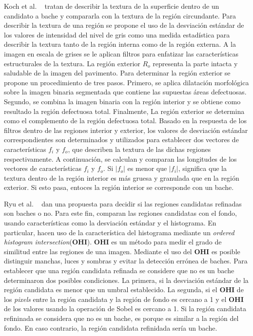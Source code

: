 		Koch et al. ~ tratan de describir la textura de la superficie dentro de un candidato a bache y compararla con la textura de la 
		región circundante. Para describir la textura de una región se propone el uso de la desviación estándar de los valores de intensidad del nivel 
		de gris como una medida estadística para describir la textura  tanto de la región interna como de la región externa. A la imagen en escala de 
		grises se le aplican filtros para enfatizar las características estructurales de la textura. La región exterior $R_o$ representa la parte intacta y 
		saludable de la imagen del pavimento. Para determinar la región exterior se propone un  procedimiento de tres pasos. Primero, 
		se aplica dilatación morfológica sobre la imagen binaria segmentada que contiene las supuestas áreas defectuosas. Segundo, 
		se combina la imagen binaria con la región interior y se obtiene como resultado la región defectuosa total. Finalmente, 
		La región exterior se determina como el complemento de la región defectuosa total. Basado en la respuesta de los filtros dentro de las regiones 
		interior y exterior, los valores de desviación estándar correspondientes son determinados y utilizados para establecer dos vectores de características 
		$f_i$ y $f_o$, que describen la textura de las dichas regiones respectivamente. A continuación, se calculan y comparan las longitudes de los vectores de 
		características $f_i$ y $f_o$. Si $|f_o|$  es menor que  $|f_i|$, significa que la textura dentro de la región interior es más gruesa y granulada que en 
		la región exterior. Si esto pasa, entoces la región interior se corresponde con un bache.


		Ryu et al. ~ dan una propuesta para decidir si las regiones candidatas refinadas son baches o no. Para este fin, 
		comparan las regiones candidatas con el fondo, usando características como la desviación estándar y el histograma. En particular, hacen 
		uso de la característica del histograma mediante un \emph{ordered histogram intersection}(\textbf{OHI}). \textbf{OHI} es un método para 
		medir el grado de similitud entre las regiones de una imagen. Mediante el uso del \textbf{OHI} es posible distinguir manchas, luces y 
		sombras y evitar la detección errónea de baches. Para establecer que una región candidata refinada se considere que no es un bache 
		determinaron dos posibles condiciones. La primera, si la desviación estándar de la región candidata es menor que un umbral establecido.
		La segunda, si el \textbf{OHI} de los \emph{pixels} entre la región candidata y la región de fondo   es cercano a 1 y el \textbf{OHI}
		de los valores usando la operación de Sobel es cercano a 1. Si la región candidata refininada se considera que no es un bache,
		es porque es similar a la región del fondo. En caso contrario, la región candidata refinidada sería un bache.

